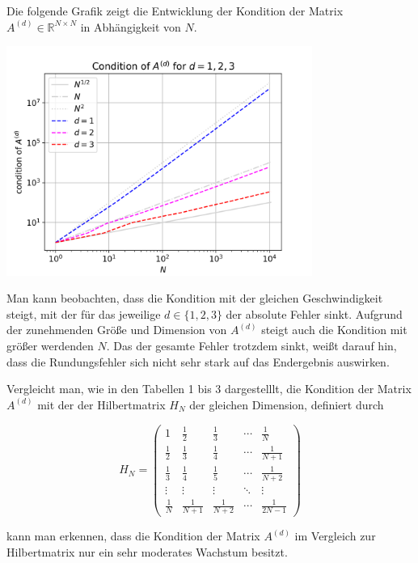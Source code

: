 \documentclass{scrartcl}
\begin{document}
Die folgende Grafik zeigt die Entwicklung der Kondition der Matrix $A^{(d)}\in\mathbb{R}^{N \times N}$ in Abhängigkeit von $N$.

{
  \centering
    \includegraphics[width=0.75\textwidth]{Grafiken/loglogcond_d123_neu}
    \vspace{-0.2cm}
}
\vspace{0.5cm}

Man kann beobachten, dass die Kondition mit der gleichen Geschwindigkeit steigt, mit der für das jeweilige $d \in \{ 1, 2, 3\}$ der absolute Fehler sinkt.
Aufgrund der zunehmenden Größe und Dimension von $A^{(d)}$ steigt auch die Kondition mit größer werdenden $N$.
Das der gesamte Fehler trotzdem sinkt, weißt darauf hin, dass die Rundungsfehler sich nicht sehr stark auf das Endergebnis auswirken.

Vergleicht man, wie in den Tabellen 1 bis 3 dargestelllt, die Kondition der Matrix $A^{(d)}$ mit der der Hilbertmatrix $H_N$ der gleichen Dimension, definiert durch

\[H_N =
\begin{pmatrix}
  1 & \frac{1}{2} & \frac{1}{3} & \cdots & \frac{1}{N} \\
  \frac{1}{2} & \frac{1}{3} & \frac{1}{4} & \cdots & \frac{1}{N+1} \\
  \frac{1}{3} & \frac{1}{4} & \frac{1}{5} & \cdots & \frac{1}{N+2} \\
  \vdots & \vdots & \vdots & \ddots & \vdots \\
  \frac{1}{N} & \frac{1}{N+1} & \frac{1}{N+2} & \cdots & \frac{1}{2N-1}
\end{pmatrix}\]\cite{tischendorf2019}

kann man erkennen, dass die Kondition der Matrix $A^{(d)}$ im Vergleich zur Hilbertmatrix nur ein sehr moderates Wachstum besitzt.
\end{document}
